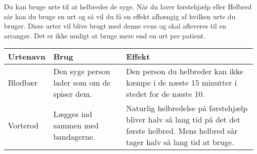 Du kan bruge urte til at helbreder de syge. Når du laver førstehjælp eller Helbred sår kan du bruge en urt og så vil du få en effekt afhængig af hvilken urte du bruger. Disse urter vil blive brugt med denne evne og skal afleveres til en arrangør. Det er ikke muligt at bruge mere end en urt per patient.
\begin{table}[H]
     \centering
    \begin{tabular}{|p{}|p{}|p{}|}
    \rowcolor{cerulean!80}\hline
        Urtenavn & Brug & Effekt \\\hline
        Blodbær & Den syge person lader som om de spiser dem. & Den person du helbreder kan ikke kæmpe i de næste 15 minutter i stedet for de næste 10.\\\hline
        Vorterod & Lægges ind sammen med bandagerne. &  Naturlig helbredelse på førstehjælp bliver halv så lang tid på det det første helbred. Mens helbred sår tager halv så lang tid at bruge.\\\hline
    \end{tabular}
\end{table}